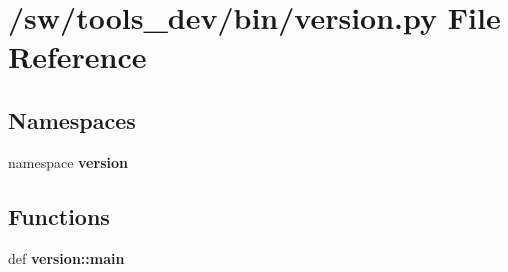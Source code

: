 \section{/sw/tools\_\-dev/bin/version.py File Reference}
\label{version_8py}
\subsection*{Namespaces}
\begin{CompactItemize}
\item 
namespace {\bf version}
\end{CompactItemize}
\subsection*{Functions}
\begin{CompactItemize}
\item 
def {\bf version::main}
\end{CompactItemize}

